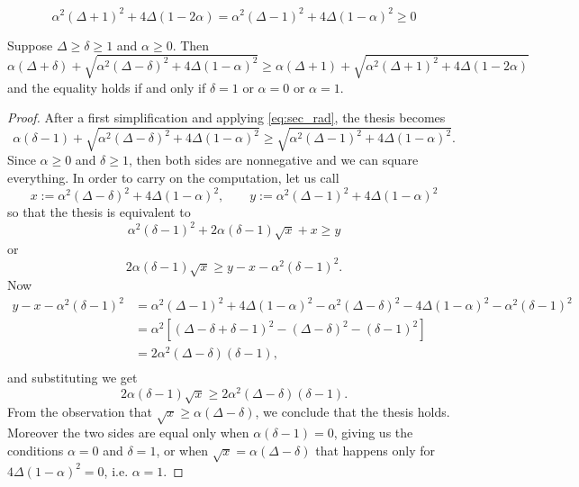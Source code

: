 \documentclass[10pt,a4paper]{amsart}
\begin{document}
\begin{equation}
    \label{eq:sec_rad}
\alpha^2(\Delta+1)^2 + 4\Delta(1-2\alpha) = \alpha^2(\Delta-1)^2 + 4\Delta(1-\alpha)^2 \ge 0
\end{equation}

\begin{proposition}
\label{prop1}    Suppose $\Delta \ge \delta \ge 1$ and $\alpha\ge 0$. Then 
        \[
    \alpha(\Delta + \delta) +\sqrt{\alpha^2(\Delta-\delta)^2 + 4\Delta(1-\alpha)^2}
    \ge 
     \alpha(\Delta + 1) +\sqrt{\alpha^2(\Delta+1)^2 + 4\Delta(1-2\alpha)}
    \]
    and the equality holds if and only if $\delta = 1$ or $\alpha = 0$ or $\alpha = 1$. 
\end{proposition}

\begin{proof}
    After a first simplification and applying \eqref{eq:sec_rad}, the thesis becomes
            \[
    \alpha(\delta-1) +\sqrt{\alpha^2(\Delta-\delta)^2 + 4\Delta(1-\alpha)^2}
    \ge 
    \sqrt{\alpha^2(\Delta-1)^2 + 4\Delta(1-\alpha)^2}.
    \]
    Since $\alpha\ge 0$ and $\delta\ge 1$, then  both sides are nonnegative and we can square everything. In order to carry on the computation, let us call
    \[
    x :=\alpha^2(\Delta-\delta)^2 + 4\Delta(1-\alpha)^2, \qquad y:= \alpha^2(\Delta-1)^2 + 4\Delta(1-\alpha)^2
    \]
    so that the thesis is equivalent to 
    \[
    \alpha^2(\delta-1)^2 + 2\alpha(\delta-1)\sqrt x + x \ge y
    \]
    or  
    \[
       2\alpha(\delta-1)\sqrt x  \ge y - x -  \alpha^2(\delta-1)^2.
    \]
    Now 
 \begin{align*}
      y - x -  \alpha^2(\delta-1)^2 &= 
      \alpha^2(\Delta-1)^2 + 4\Delta(1-\alpha)^2 - \alpha^2(\Delta-\delta)^2 - 4\Delta(1-\alpha)^2 - \alpha^2(\delta-1)^2\\
      &= \alpha^2\left[ 
      (\Delta-\delta + \delta - 1)^2  - (\Delta-\delta)^2 -(\delta-1)^2
      \right]\\
      &= 2\alpha^2(\Delta-\delta)(\delta-1),\\
 \end{align*} 
 and substituting we get
 \[
  2\alpha(\delta-1)\sqrt x  \ge 2\alpha^2(\Delta-\delta)(\delta-1).
 \]
 From the observation that  $\sqrt x \ge \alpha(\Delta-\delta)$, we conclude that the thesis holds. Moreover the two sides are equal only when $\alpha(\delta-1) =0$, giving us the conditions $\alpha=0$ and $\delta=1$, or when $\sqrt x = \alpha(\Delta-\delta)$ that happens only for $4\Delta(1-\alpha)^2 = 0$, i.e. $\alpha = 1$. 
\end{proof}
\end{document}

